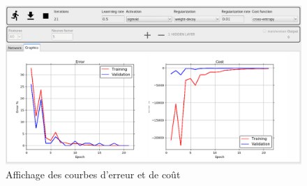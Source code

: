 \documentclass[11pt]{article}
\begin{document}
\begin{figure}[htp]
	\centering
	\includegraphics[scale=.27]{img/courbe.png}
	\caption{Affichage des courbes d'erreur et de co\^ut}
	\label{guierr}
\end{figure}
\end{document}
